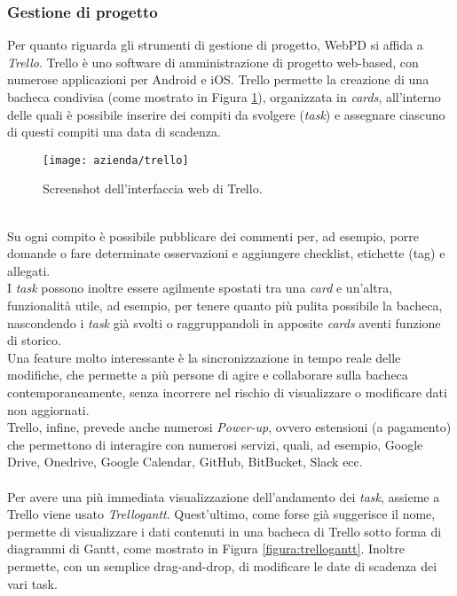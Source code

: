 \subsubsection{Gestione di progetto}
Per quanto riguarda gli strumenti di gestione di progetto, WebPD si affida a \textit{Trello}. 
Trello è uno software di amministrazione di progetto web-based, con numerose applicazioni per Android e iOS. Trello permette la creazione di una bacheca condivisa (come mostrato in Figura \ref{figura:trello}), organizzata in \textit{cards}, all'interno delle quali è possibile inserire dei compiti da svolgere (\textit{task}) e assegnare ciascuno di questi compiti una data di scadenza. \\
\begin{figure}[!h] 
	\centering 
	\texttt{[image: azienda/trello]} 
	\caption{Screenshot dell'interfaccia web di Trello.}
	\label{figura:trello}
\end{figure}\\
Su ogni compito è possibile pubblicare dei commenti per, ad esempio, porre domande o fare determinate osservazioni e aggiungere checklist, etichette (tag) e allegati.\\ 
I \textit{task} possono inoltre essere agilmente spostati tra una \textit{card} e un'altra, funzionalità utile, ad esempio, per tenere quanto più pulita possibile la bacheca, nascondendo i \textit{task} già svolti o raggruppandoli in apposite \textit{cards} aventi funzione di storico.\\
Una feature molto interessante è la sincronizzazione in tempo reale delle modifiche, che permette a più persone di agire e collaborare sulla bacheca contemporaneamente, senza incorrere nel rischio di visualizzare o modificare dati non aggiornati.\\
Trello, infine, prevede anche numerosi \textit{Power-up}, ovvero estensioni (a pagamento) che permettono di interagire con numerosi servizi, quali, ad esempio, Google Drive, Onedrive, Google Calendar, GitHub, BitBucket, Slack ecc.\\
\\
Per avere una più immediata visualizzazione dell'andamento dei \textit{task}, assieme a Trello viene usato \textit{Trellogantt}. Quest'ultimo, come forse già suggerisce il nome, permette di visualizzare i dati contenuti in una bacheca di Trello sotto forma di diagrammi di Gantt, come mostrato in Figura \ref{figura:trellogantt}. Inoltre permette, con un semplice drag-and-drop, di modificare le date di scadenza dei vari task.\\

